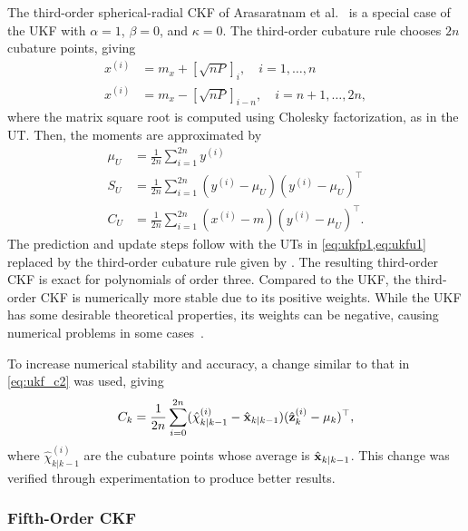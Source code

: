 \documentclass[../zhang_thesis.tex]{subfiles}
\begin{document}
The third-order spherical-radial CKF of Arasaratnam et al.~\cite{arasaratnam09,arasaratnam10} is a special case of the UKF with $\alpha=1$, $\beta=0$, and $\kappa=0$. The third-order cubature rule chooses $2n$ cubature points, giving~\cite{arasaratnam10}
\begin{align}
    x^{(i)} & = m_x + \left[ \sqrt{nP} \right]_i, \quad i=1,\dots,n \label{eq:cr3_1} \\
    x^{(i)} & = m_x - \left[ \sqrt{nP} \right]_{i-n}, \quad i=n+1,\dots,2n,
\end{align}
where the matrix square root is computed using Cholesky factorization, as in the UT. Then, the moments are approximated by
\begin{align}
    \mu_U & = \frac{1}{2n} \sum_{i=1}^{2n} y^{(i)} \\
    S_U & = \frac{1}{2n} \sum_{i=1}^{2n} ( y^{(i)} - \mu_U ) ( y^{(i)} - \mu_U )^\top \\
    C_U & = \frac{1}{2n} \sum_{i=1}^{2n} ( x^{(i)} - m ) ( y^{(i)} - \mu_U )^\top. \label{eq:cr3_l}
\end{align}
The prediction and update steps follow  with the UTs in \cref{eq:ukfp1,eq:ukfu1} replaced by the third-order cubature rule given by . The resulting third-order CKF is exact for polynomials of order three. Compared to the UKF, the third-order CKF is numerically more stable due to its positive weights. While the UKF has some desirable theoretical properties, its weights can be negative, causing numerical problems in some
cases~\cite{sarkka12}.

To increase numerical stability and accuracy, a change similar to that in \cref{eq:ukf_c2} was used, giving
\begin{equation}
    C_k = \frac{1}{2n} \sum_{i=0}^{2n} ( \hat{\chi}_{k|k-1}^{(i)} - \hat{\mathbf{x}}_{k|k-1} ) ( \hat{\mathbf{z}}_k^{(i)} - \mu_k )^\top,
    \label{eq:ckf3_c}
\end{equation}
where $\hat{\chi}_{k|k-1}^{(i)}$ are the cubature points whose average is $\hat{\mathbf{x}}_{k|k-1}$. This change was verified through experimentation to produce better results.

\subsubsection{Fifth-Order CKF}
\end{document}
